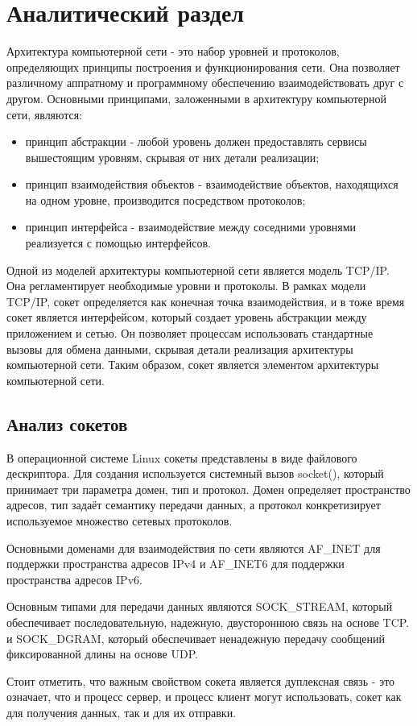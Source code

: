\chapter{Аналитический раздел}
Архитектура компьютерной сети - это набор уровней и протоколов, 
определяющих принципы построения и функционирования сети. Она позволяет 
различному аппратному и программному обеспечению взаимодействовать 
друг с другом.\cite{kurouz_book} Основными принципами, заложенными в архитектуру компьютерной сети, 
являются:
\begin{itemize}
	\item принцип абстракции - любой уровень должен предоставлять сервисы вышестоящим уровням, скрывая от них детали реализации;
	\item принцип взаимодействия объектов - взаимодействие объектов, находящихся на одном уровне, производится посредством протоколов; 
	\item принцип интерфейса - взаимодействие между соседними уровнями реализуется с помощью интерфейсов.   
\end{itemize}

Одной из моделей архитектуры компьютерной сети является модель TCP/IP. 
Она регламентирует необходимые уровни и протоколы. 
В рамках модели TCP/IP, сокет определяется как конечная точка взаимодействия, 
и в тоже время сокет является интерфейсом, 
который создает уровень абстракции между приложением и сетью. 
Он позволяет процессам использовать стандартные вызовы для обмена данными, 
скрывая детали реализация архитектуры компьютерной сети. 
Таким образом, сокет является элементом архитектуры компьютерной сети.
\section{Анализ сокетов}
В операционной системе Linux сокеты представлены в виде файлового дескриптора. 
Для создания используется системный вызов socket(), 
который принимает три параметра домен, тип и протокол.\cite{man}
Домен определяет пространство адресов,
тип задаёт семантику передачи данных, а протокол конкретизирует используемое
множество сетевых протоколов.
\par
Основными доменами для взаимодействия по сети являются 
AF\_INET для поддержки пространства адресов IPv4 
и AF\_INET6 для поддержки пространства адресов IPv6. 
\par
Основным типами для передачи данных являются SOCK\_STREAM, 
который обеспечивает последовательную, надежную, двустороннюю связь на основе TCP.
и SOCK\_DGRAM, который обеспечивает ненадежную передачу сообщений фиксированной длины на основе UDP.
\par
Стоит отметить, что важным свойством сокета является дуплексная связь - это означает, 
что и процесс сервер, и процесс клиент могут использовать, сокет как для получения данных, так и для их отправки.

